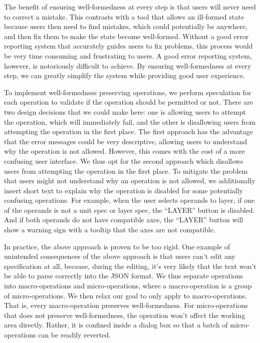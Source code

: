 \documentclass[journal]{vgtc}                %
\begin{document}
The benefit of ensuring well-formedness at every step is that users will never
need to correct a mistake. This contrasts with a tool that allows an ill-formed
state because users then need to find mistakes, which could potentially be anywhere,
and then fix them to make the state become well-formed. Without a good error reporting
system that accurately guides users to fix problems, this process would be very time
consuming and frustrating to users. A good error reporting system, however, is
notoriously difficult to achieve. By ensuring well-formedness at every step, we
can greatly simplify the system while providing good user experience.

To implement well-formedness preserving operations, we perform speculation for
each operation to validate if the operation should be permitted or not. There
are two design decisions that we could make here: one is allowing users to attempt
the operation, which will immediately fail, and the other is disallowing users
from attempting the operation in the first place. The first approach has the advantage
that the error messages could be very descriptive, allowing users to understand
why the operation is not allowed. However, this comes with the cost of a more
confusing user interface. We thus opt for the second approach which disallows
users from attempting the operation in the first place. To mitigate the problem
that users might not understand why an operation is not allowed, we additionally
insert short text to explain why the operation is disabled for some potentially
confusing operations. For example, when the user selects operands to layer, if
one of the operands is not a unit spec or layer spec, the “LAYER” button is
disabled. And if both operands do not have compatible axes, the “LAYER” button
will show a warning sign with a tooltip that the axes are not compatible.

In practice, the above approach is proven to be too rigid. One example of
unintended consequences of the above approach is that users can’t edit any
specification at all, because, during the editing, it’s very likely that
the text won’t be able to parse correctly into the JSON format. We thus
separate operations into macro-operations and micro-operations, where a
macro-operation is a group of micro-operations. We then relax our goal to
only apply to macro-operations. That is, every macro-operation preserves
well-formedness. For micro-operations that does not preserve well-formedness,
the operation won’t affect the working area directly. Rather, it is confined
inside a dialog box so that a batch of micro-operations can be readily reverted.
\end{document}
